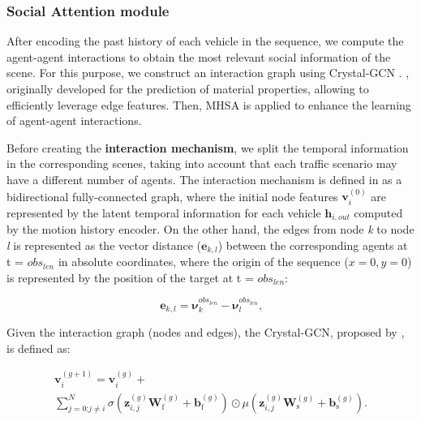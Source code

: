 \subsubsection{Social Attention module}
\label{subsubsec:4_efficient_baselines_social_interactions}

After encoding the past history of each vehicle in the sequence, we compute the agent-agent interactions to obtain the most relevant social information of the scene. For this purpose, we construct an interaction graph using Crystal-GCN \cite{xie2018crystal} \cite{schmidt2022crat}. , originally developed for the prediction of material properties, allowing to efficiently leverage edge features. Then, \ac{MHSA} \cite{vaswani2017attention} is applied to enhance the learning of agent-agent interactions. 

Before creating the \textbf{interaction mechanism}, we split the temporal information in the corresponding scenes, taking into account that each traffic scenario may have a different number of agents. The interaction mechanism is defined in \cite{schmidt2022crat} as a bidirectional fully-connected graph, where the initial node features $\mathbf{v}_i^{(0)}$ are represented by the latent temporal information for each vehicle $\mathbf{h}_{i,out}$ computed by the motion history encoder. On the other hand, the edges from node \textit{k} to node \textit{l} is represented as the vector distance ($\mathbf{e}_{k,l}$) between the corresponding agents at t = \textit{$obs_{len}$} in absolute coordinates, where the origin of the sequence ($x=0,y=0$) is represented by the position of the target at t = \textit{$obs_{len}$}:

\begin{equation}
	\mathbf{e}_{k,l} = \boldsymbol{\nu}^{obs_{len}}_k - \boldsymbol{\nu}^{obs_{len}}_l \text{,}
\end{equation}

Given the interaction graph (nodes and edges), the Crystal-GCN, proposed by \cite{xie2018crystal}, is defined as:

\begin{multline}
	\mathbf{v}_i^{(g+1)} = \mathbf{v}_i^{(g)} + \\
	\sum_{j = 0 \textbf{:} j \neq i }^{N} \sigma \left( \mathbf{z}_{i,j}^{(g)} \mathbf{W}_\mathrm{f}^{(g)} + \mathbf{b}_\mathrm{f}^{(g)} \right)
	\odot \mu \left( \mathbf{z}_{i,j}^{(g)} \mathbf{W}_\mathrm{s}^{(g)} + \mathbf{b}_\mathrm{s}^{(g)}  \right) \text{.}
\end{multline}

